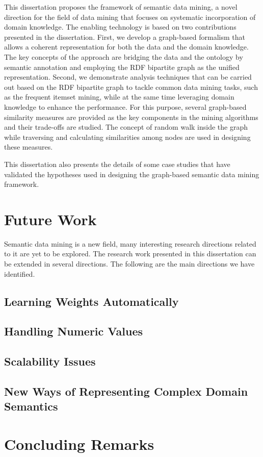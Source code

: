 This dissertation proposes the framework of semantic data mining, a novel direction for the field of data mining that focuses on systematic incorporation of domain knowledge. The enabling technology is based on two contributions presented in the dissertation. First, we develop a graph-based formalism that allows a coherent representation for both the data and the domain knowledge. The key concepts of the approach are bridging the data and the ontology by semantic annotation and employing the RDF bipartite graph as the unified representation. Second, we demonstrate analysis techniques that can be carried out based on the RDF bipartite graph to tackle common data mining tasks, such as the frequent itemset mining, while at the same time leveraging domain knowledge to enhance the performance. For this purpose, several graph-based similarity measures are provided as the key components in the mining algorithms and their trade-offs are studied. The concept of random walk inside the graph while traversing and calculating similarities among nodes are used in designing these measures. 

This dissertation also presents the details of some case studies that have validated the hypotheses used in designing the graph-based semantic data mining framework.

\section{Future Work}
Semantic data mining is a new field, many interesting research directions related to it are yet to be explored. The research work presented in this dissertation can be extended in several directions. The following are the main directions we have identified.

\subsection{Learning Weights Automatically}
\subsection{Handling Numeric Values}
\subsection{Scalability Issues}
\subsection{New Ways of Representing Complex Domain Semantics}

\section{Concluding Remarks}